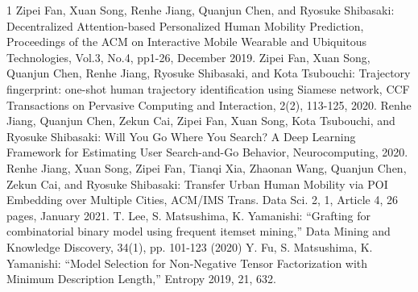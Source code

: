 \begin{雑誌論文}{1}
Zipei Fan, Xuan Song, Renhe Jiang, Quanjun Chen, and Ryosuke Shibasaki:
Decentralized Attention-based Personalized Human Mobility Prediction, Proceedings of the ACM on Interactive Mobile Wearable and Ubiquitous Technologies, Vol.3, No.4, pp1-26, December 2019.
Zipei Fan, Xuan Song, Quanjun Chen, Renhe Jiang, Ryosuke Shibasaki, and Kota Tsubouchi:  
Trajectory fingerprint: one-shot human trajectory identification using Siamese network, CCF Transactions on Pervasive Computing and Interaction, 2(2), 113-125, 2020.
Renhe Jiang, Quanjun Chen, Zekun Cai, Zipei Fan, Xuan Song, Kota Tsubouchi, and Ryosuke Shibasaki: 
Will You Go Where You Search? A Deep Learning Framework for Estimating User Search-and-Go Behavior, Neurocomputing, 2020.
Renhe Jiang, Xuan Song, Zipei Fan, Tianqi Xia, Zhaonan Wang, Quanjun Chen, Zekun Cai, and Ryosuke Shibasaki: 
Transfer Urban Human Mobility via POI Embedding over Multiple Cities, ACM/IMS Trans. Data Sci. 2, 1, Article 4, 26 pages, January 2021.
T. Lee, S. Matsushima, K. Yamanishi: “Grafting for combinatorial binary model using frequent itemset mining,” Data Mining and Knowledge Discovery, 34(1), pp. 101-123 (2020)
Y. Fu, S. Matsushima, K. Yamanishi: “Model Selection for Non-Negative Tensor Factorization with Minimum Description Length,” Entropy 2019, 21, 632.
	
\end{雑誌論文}

